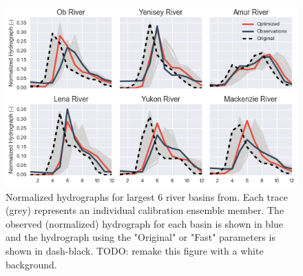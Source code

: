 \documentclass[jgrga, draft]{agutex}
\begin{document}
\clearpage
\begin{figure}
\noindent\includegraphics[width=40pc,natwidth=1]{calibration_hydrographs}
\caption{Normalized hydrographs for largest 6 river basins from.  Each trace (grey) represents an individual calibration ensemble member. The observed (normalized) hydrograph for each basin is shown in blue and the hydrograph using the "Original" or "Fast" parameters is shown in dash-black. TODO: remake this figure with a white background.}
\label{fig:calibration_hydrographs}
\end{figure}
\end{document}
